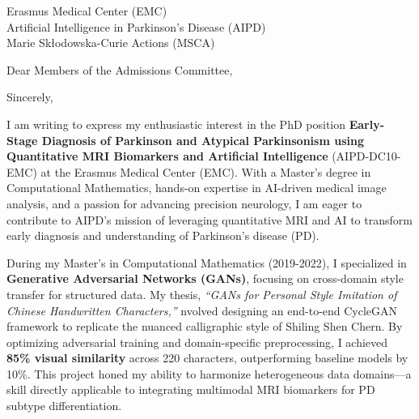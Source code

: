 \documentclass[11pt,a4paper, final]{moderncv}
\begin{document}
{Erasmus Medical Center (EMC)\\
Artificial Intelligence in Parkinson's Disease (AIPD)\\
Marie Skłodowska-Curie Actions (MSCA)
}
\date{\today}
\opening{Dear Members of the Admissions Committee,}
\closing{Sincerely,}
\makelettertitle
\thispagestyle{empty}
\pagestyle{empty}
I am writing to express my enthusiastic interest in the PhD position 
\textbf{Early-Stage Diagnosis of Parkinson and Atypical Parkinsonism using Quantitative MRI Biomarkers and Artificial Intelligence} (AIPD-DC10-EMC) at the Erasmus Medical Center (EMC). 
With a Master's degree in Computational Mathematics, 
hands-on expertise in AI-driven medical image analysis, 
and a passion for advancing precision neurology, 
I am eager to contribute to AIPD's mission of leveraging quantitative MRI and AI to transform early diagnosis and understanding of Parkinson's disease (PD).

During my Master's in Computational Mathematics (2019-2022), 
I specialized in \textbf{Generative Adversarial Networks (GANs)}, 
focusing on cross-domain style transfer for structured data. 
My thesis, \emph{``GANs for Personal Style Imitation of Chinese Handwritten Characters,''} 
nvolved designing an end-to-end CycleGAN framework to replicate the nuanced calligraphic style of Shiling Shen Chern. 
By optimizing adversarial training and domain-specific preprocessing, 
I achieved \textbf{85\% visual similarity} across 220 characters, outperforming baseline models by 10\%. 
This project honed my ability to harmonize heterogeneous data domains—a skill directly applicable to integrating multimodal MRI biomarkers for PD subtype differentiation.
\end{document}
